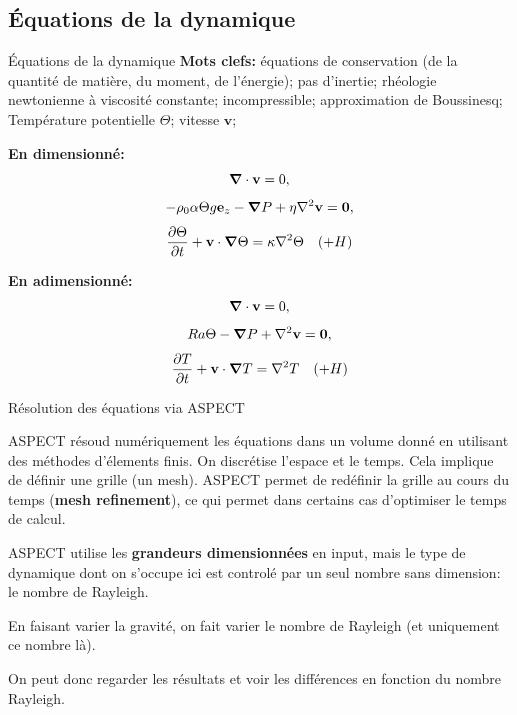 \documentclass[9pt]{beamer}
\newcommand{\bnabla}{\mbox{\boldmath$\nabla$}}
\begin{document}
\subsection{Équations de la dynamique}

\begin{frame}{Équations de la dynamique}
    \textbf{Mots clefs:} équations de conservation (de la quantité de matière, du moment, de l'énergie); pas d'inertie; rhéologie newtonienne à viscosité constante; incompressible; approximation de Boussinesq; Température potentielle $\Theta$; vitesse $\mathbf{v}$;
    
    \textbf{En dimensionné:}
    \begin{equation*}
        \bnabla \cdot \mathbf{v} = 0,
    \end{equation*}
    \begin{equation*}
        -\rho_0 \alpha \Theta g \mathbf{e}_z - \bnabla P +\eta \nabla ^2 \mathbf{v} =\mathbf{0}, 
    \end{equation*}
    \begin{equation*}
        \frac{\partial \Theta}{\partial t}+\mathbf{v}\cdot \bnabla \Theta = \kappa \nabla ^2 \Theta \ \ \ (+ H)
    \end{equation*}
    
    \textbf{En adimensionné:}
    \begin{equation*}
        \bnabla \cdot \mathbf{v} = 0,       
    \end{equation*}
    \begin{equation*}
        Ra \Theta - \bnabla P + \nabla ^2 \mathbf{v} =\mathbf{0}, 
    \end{equation*}
    \begin{equation*}
        \frac{\partial T}{\partial t}+\mathbf{v}\cdot \bnabla T =  \nabla ^2 T \ \ \ (+ H)
    \end{equation*}
\end{frame}

\begin{frame}{Résolution des équations via ASPECT}

    
ASPECT résoud numériquement les équations dans un volume donné en utilisant des méthodes d'élements finis. On discrétise l'espace et le temps. Cela implique de définir une grille (un mesh). ASPECT permet de redéfinir la grille au cours du temps (\textbf{mesh refinement}), ce qui permet dans certains cas d'optimiser le temps de calcul.

    ASPECT utilise les \textbf{grandeurs dimensionnées} en input, mais le type de dynamique dont on s'occupe ici est controlé par un seul nombre sans dimension: le nombre de Rayleigh. 
    
    En faisant varier la gravité, on fait varier le nombre de Rayleigh (et uniquement ce nombre là). 
    
    On peut donc regarder les résultats et voir les différences en fonction du nombre Rayleigh. 
\end{frame}
\end{document}

